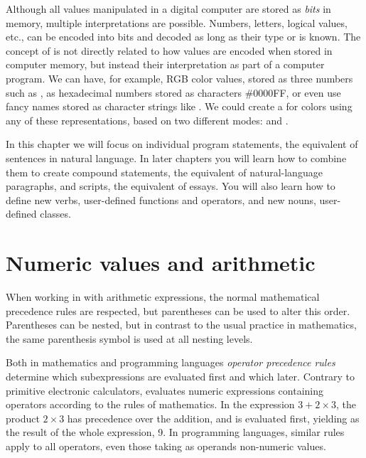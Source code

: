\documentclass[krantz2]{krantz}\usepackage{knitr}
\begin{document}
Although all values manipulated in a digital computer are stored as \textit{bits} in memory, multiple interpretations are possible. Numbers, letters, logical values, etc., can be encoded into bits and decoded as long as their type or  is known. The concept of  is not directly related to how values are encoded when stored in computer memory, but instead their interpretation as part of a computer program. We can have, for example, RGB color values, stored as three numbers such as , as hexadecimal numbers stored as characters {\#0000FF}, or even use fancy names stored as character strings like . We could create a  for colors using any of these representations, based on two different modes:  and .

In this chapter we will focus on individual program statements, the equivalent of sentences in natural language. In later chapters you will learn how to combine them to create compound statements, the equivalent of natural-language paragraphs, and scripts, the equivalent of essays. You will also learn how to define new verbs, user-defined functions and operators, and new nouns, user-defined classes.

\section{Numeric values and arithmetic}
\qRoperator{+}\qRoperator{-}\qRoperator{*}\qRoperator{/}
When working in \Rlang with arithmetic expressions, the normal mathematical precedence rules are respected, but parentheses can be used to alter this order. Parentheses can be nested, but in contrast to the usual practice in mathematics, the same parenthesis symbol is used at all nesting levels.

\begin{explainbox}
 Both in mathematics and programming languages \emph{operator precedence rules} determine which subexpressions are evaluated first and which later. Contrary to primitive electronic calculators, \Rlang evaluates numeric expressions containing operators according to the rules of mathematics. In the expression $3 + 2 \times 3$, the product $2 \times 3$ has precedence over the addition, and is evaluated first, yielding as the result of the whole expression, 9. In programming languages, similar rules apply to all operators, even those taking as operands non-numeric values.
\end{explainbox}
\end{document}
